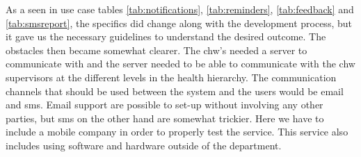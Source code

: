 As a seen in use case tables \ref{tab:notifications}, \ref{tab:reminders}, \ref{tab:feedback} and \ref{tab:smsreport}, the specifics did change along with the development process, but it gave us the necessary guidelines to understand the desired outcome.
The obstacles then became somewhat clearer. The \gls{chw}'s needed a server to communicate with and the server needed to be able to communicate with the \gls{chw} supervisors at the different levels in the health hierarchy.
The communication channels that should be used between the system and the users would be email and \gls{sms}. Email support are possible to set-up without involving any other parties, but \gls{sms} on the other hand are somewhat trickier. Here we have to include a mobile company in order to properly test the service. This service also includes using software and hardware outside of the department.

\newpage
